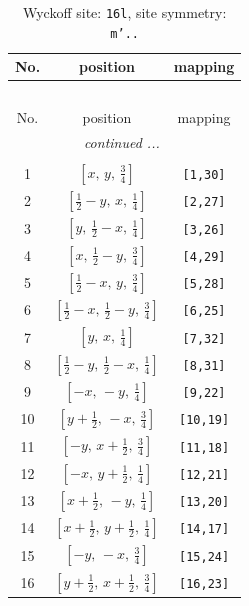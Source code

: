 \documentclass[fleqn,8pt]{jsarticle}
\begin{document}
\renewcommand{\arraystretch}{1.2}
\begin{longtable}{ccc}
\caption{Wyckoff site: {\tt 16l}, site symmetry: {\tt m'..}}
 \\
 \hline \hline
No. & position & mapping \\ \hline \endfirsthead

\multicolumn{2}{l}{\tablename\ \thetable{}} \\
 \hline \hline
No. & position & mapping \\ \hline \endhead

 \hline \hline
\multicolumn{2}{r}{\footnotesize\it continued ...} \\ \endfoot

 \hline \hline
\multicolumn{2}{r}{} \\ \endlastfoot

1 & $\left[ x,\, y,\, \frac{3}{4} \right]$ & {\tt [1,30]} \\ \hline
2 & $\left[ \frac{1}{2} - y,\, x,\, \frac{1}{4} \right]$ & {\tt [2,27]} \\ \hline
3 & $\left[ y,\, \frac{1}{2} - x,\, \frac{1}{4} \right]$ & {\tt [3,26]} \\ \hline
4 & $\left[ x,\, \frac{1}{2} - y,\, \frac{3}{4} \right]$ & {\tt [4,29]} \\ \hline
5 & $\left[ \frac{1}{2} - x,\, y,\, \frac{3}{4} \right]$ & {\tt [5,28]} \\ \hline
6 & $\left[ \frac{1}{2} - x,\, \frac{1}{2} - y,\, \frac{3}{4} \right]$ & {\tt [6,25]} \\ \hline
7 & $\left[ y,\, x,\, \frac{1}{4} \right]$ & {\tt [7,32]} \\ \hline
8 & $\left[ \frac{1}{2} - y,\, \frac{1}{2} - x,\, \frac{1}{4} \right]$ & {\tt [8,31]} \\ \hline
9 & $\left[ - x,\, - y,\, \frac{1}{4} \right]$ & {\tt [9,22]} \\ \hline
10 & $\left[ y + \frac{1}{2},\, - x,\, \frac{3}{4} \right]$ & {\tt [10,19]} \\ \hline
11 & $\left[ - y,\, x + \frac{1}{2},\, \frac{3}{4} \right]$ & {\tt [11,18]} \\ \hline
12 & $\left[ - x,\, y + \frac{1}{2},\, \frac{1}{4} \right]$ & {\tt [12,21]} \\ \hline
13 & $\left[ x + \frac{1}{2},\, - y,\, \frac{1}{4} \right]$ & {\tt [13,20]} \\ \hline
14 & $\left[ x + \frac{1}{2},\, y + \frac{1}{2},\, \frac{1}{4} \right]$ & {\tt [14,17]} \\ \hline
15 & $\left[ - y,\, - x,\, \frac{3}{4} \right]$ & {\tt [15,24]} \\ \hline
16 & $\left[ y + \frac{1}{2},\, x + \frac{1}{2},\, \frac{3}{4} \right]$ & {\tt [16,23]} \\
\end{longtable}
\end{document}
